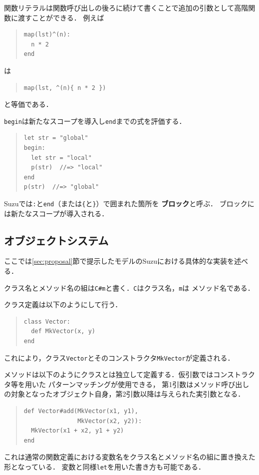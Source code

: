 \documentclass{ipsjprosym}
\begin{document}
関数リテラルは関数呼び出しの後ろに続けて書くことで追加の引数として高階関数に渡すことができる．
例えば
\begin{quote}
\begin{verbatim}
map(lst)^(n):
  n * 2
end
\end{verbatim}
\end{quote}
は
\begin{quote}
\begin{verbatim}
map(lst, ^(n){ n * 2 })
\end{verbatim}
\end{quote}
と等価である．

\verb|begin|は新たなスコープを導入し\verb|end|までの式を評価する．
\begin{quote}
\begin{verbatim}
let str = "global"
begin:
  let str = "local"
  p(str)  //=> "local"
end
p(str)  //=> "global"
\end{verbatim}
\end{quote}
Suzuでは\verb|:|と\verb|end|（または\verb|{|と\verb|}|）で囲まれた箇所を
\textbf{ブロック}と呼ぶ．
ブロックには新たなスコープが導入される．

\subsection{オブジェクトシステム}

ここでは\ref{sec:proposal}節で提示したモデルのSuzuにおける具体的な実装を述べる．

クラス名とメソッド名の組は\verb|C#m|と書く．\verb|C|はクラス名，\verb|m|は
メソッド名である．

クラス定義は以下のようにして行う．
\begin{quote}
\begin{verbatim}
class Vector:
  def MkVector(x, y)
end
\end{verbatim}
\end{quote}
これにより，クラス\verb|Vector|とそのコンストラクタ\verb|MkVector|が定義される．

メソッドは以下のようにクラスとは独立して定義する．仮引数ではコンストラクタ等を用いた
パターンマッチングが使用できる，
第1引数はメソッド呼び出しの対象となったオブジェクト自身，第2引数以降は与えられた実引数となる．
\begin{quote}
\begin{verbatim}
def Vector#add(MkVector(x1, y1),
               MkVector(x2, y2)):
  MkVector(x1 + x2, y1 + y2)
end
\end{verbatim}
\end{quote}
これは通常の関数定義における変数名をクラス名とメソッド名の組に置き換えた形となっている．
変数と同様\verb|let|を用いた書き方も可能である．
\end{document}
